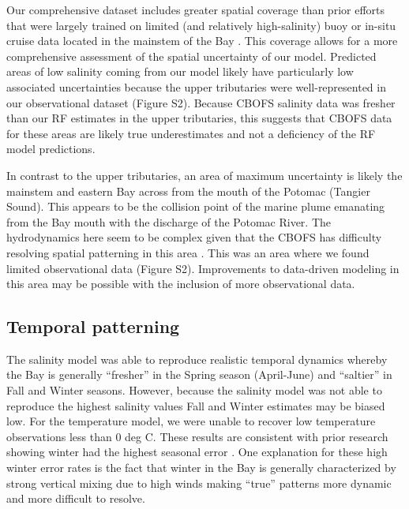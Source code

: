 \documentclass{article}
\begin{document}
Our comprehensive dataset includes greater spatial coverage than prior efforts that were  largely trained on limited (and relatively high-salinity) buoy or in-situ cruise data located in the mainstem of the Bay \cite{vogelAssessingSatelliteSea2016, geigerSatellitederivedCoastalOcean2013, ondrusekDevelopmentNewOptical2012}. This coverage allows for a more comprehensive assessment of the spatial uncertainty of our model. Predicted areas of low salinity coming from our model likely have particularly low associated uncertainties because the upper tributaries were well-represented in our observational dataset (Figure S2). Because CBOFS salinity data was fresher than our RF estimates in the upper tributaries, this suggests that CBOFS data for these areas are likely true underestimates and not a deficiency of the RF model predictions.

In contrast to the upper tributaries, an area of maximum uncertainty is likely the mainstem and eastern Bay across from the mouth of the Potomac (Tangier Sound). This appears to be the collision point of the marine plume emanating from the Bay mouth with the discharge of the Potomac River. The hydrodynamics here seem to be complex given that the CBOFS has difficulty resolving spatial patterning in this area \cite{lanerolle2011second}. This was an area where we found limited observational data (Figure S2). Improvements to data-driven modeling in this area may be possible with the inclusion of more observational data.


\subsection{Temporal patterning}

The salinity model was able to reproduce realistic temporal dynamics whereby the Bay is generally “fresher” in the Spring season (April-June) and “saltier” in Fall and Winter seasons. However, because the salinity model was not able to reproduce the highest salinity values Fall and Winter estimates may be biased low. For the temperature model, we were unable to recover low temperature observations less than 0 deg C. These results are consistent with prior research showing winter had the highest seasonal error  \cite{geigerSatellitederivedCoastalOcean2013}. One explanation for these high winter error rates is the fact that winter in the Bay is generally characterized by strong vertical mixing due to high winds \cite{sonWaterPropertiesChesapeake2012, xuClimateForcingSalinity2012} making “true” patterns more dynamic and more difficult to resolve.
\end{document}
